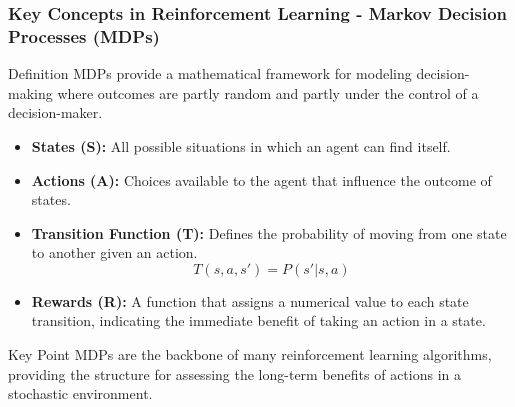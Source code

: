 \documentclass[aspectratio=169]{beamer}
\begin{document}
\begin{frame}[fragile]
    \frametitle{Key Concepts in Reinforcement Learning - Markov Decision Processes (MDPs)}
    \begin{block}{Definition}
        MDPs provide a mathematical framework for modeling decision-making where outcomes are partly random and partly under the control of a decision-maker.
    \end{block}
    \begin{itemize}
        \item \textbf{States (S):} All possible situations in which an agent can find itself.
        \item \textbf{Actions (A):} Choices available to the agent that influence the outcome of states.
        \item \textbf{Transition Function (T):} Defines the probability of moving from one state to another given an action.
        \[
        T(s, a, s') = P(s' | s, a)
        \]
        \item \textbf{Rewards (R):} A function that assigns a numerical value to each state transition, indicating the immediate benefit of taking an action in a state.
    \end{itemize}
    \begin{block}{Key Point}
        MDPs are the backbone of many reinforcement learning algorithms, providing the structure for assessing the long-term benefits of actions in a stochastic environment.
    \end{block}
\end{frame}
\end{document}

